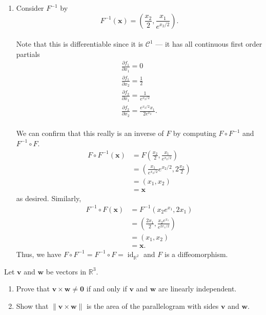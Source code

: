 \documentclass[12 pt, letterpaper]{hmcpset}
\begin{document}
\begin{solution}
\begin{enumerate}
\[\begin{split}
\begin{bmatrix}
						2 & 0
					\end{bmatrix}.
				\end{split}
			\]
			Since this has determinant $-2e^{x_1}$ which is nonzero for all $x_1 \in \mathbb{R}$, this is always invertible, and thus, $F$ is regular.
		\item 
			Consider $F^{-1}$ by
			\[
				F^{-1}(\mathbf{x}) = \left ( \frac{x_2}{2}, \frac{x_1}{e^{x_2/2}} \right ).
			\] \\
			Note that this is differentiable since it is $\mathcal{C}^1$ --- it has all continuous first order partials
			\[
				\begin{gathered}
					\frac{\partial f_1}{\partial x_1} = 0 \\
					\frac{\partial f_1}{\partial x_2} = \frac{1}{2} \\
					\frac{\partial f_2}{\partial x_1} = \frac{1}{e^{x_2/2}} \\
					\frac{\partial f_2}{\partial x_2} = \frac{e^{x_2/2} x_1}{2 e^{x_2}}.
				\end{gathered}
			\] \\
			We can confirm that this really is an inverse of $F$ by computing $F \circ F^{-1}$ and $F^{-1} \circ F$.
			\[
				\begin{split}
					F \circ F^{-1}(\mathbf{x}) & = F(\frac{x_2}{2}, \frac{x_1}{e^{x_2/2}}) \\
								   & = \left ( \frac{x_1}{e^{x_2/2}} e^{x_2/2}, 2 \frac{x_2}{2} \right ) \\
								   & = \left ( x_1, x_2 \right ) \\
								   & = \mathbf{x}
				\end{split}
			\]
			as desired. Similarly,
			\[
				\begin{split}
					F^{-1} \circ F(\mathbf{x}) & = F^{-1}(x_2 e^{x_1}, 2 x_1) \\
								   & = (\frac{2 x_1}{2}, \frac{x_2 e^{x_1}}{e^{2x_1/2}}) \\
								   & = (x_1, x_2) \\
								   & = \mathbf{x}.
				\end{split}
			\]
			Thus, we have $F \circ F^{-1} = F^{-1} \circ F = \operatorname{id}_{\mathbb{R}^2}$ and $F$ is a diffeomorphism.
	\end{enumerate}
\end{solution}

\pagebreak

\begin{problem}[Problem 3.]
	Let $\mathbf{v}$ and $\mathbf{w}$ be vectors in $\mathbb{R}^3$.
	\begin{enumerate}
		\item Prove that $\mathbf{v} \times \mathbf{w} \neq \mathbf{0}$ if and only if $\mathbf{v}$ and $\mathbf{w}$ are linearly independent.
		\item Show that $\lVert \mathbf{v} \times \mathbf{w} \rVert$ is the area of the parallelogram with sides $\mathbf{v}$ and $\mathbf{w}$.
	\end{enumerate}
\end{problem}
\end{document}
